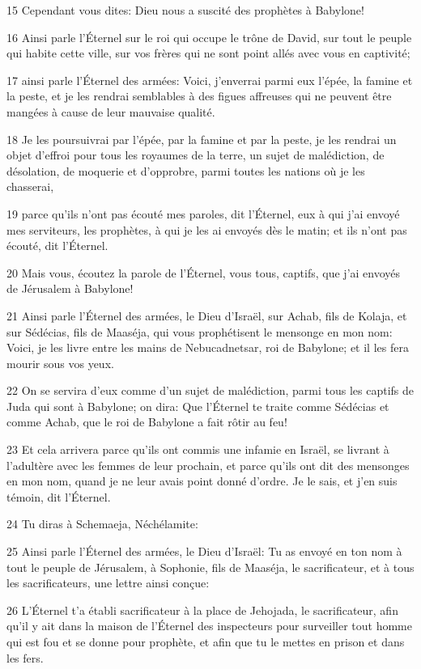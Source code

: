 \par 15 Cependant vous dites: Dieu nous a suscité des prophètes à Babylone!
\par 16 Ainsi parle l'Éternel sur le roi qui occupe le trône de David, sur tout le peuple qui habite cette ville, sur vos frères qui ne sont point allés avec vous en captivité;
\par 17 ainsi parle l'Éternel des armées: Voici, j'enverrai parmi eux l'épée, la famine et la peste, et je les rendrai semblables à des figues affreuses qui ne peuvent être mangées à cause de leur mauvaise qualité.
\par 18 Je les poursuivrai par l'épée, par la famine et par la peste, je les rendrai un objet d'effroi pour tous les royaumes de la terre, un sujet de malédiction, de désolation, de moquerie et d'opprobre, parmi toutes les nations où je les chasserai,
\par 19 parce qu'ils n'ont pas écouté mes paroles, dit l'Éternel, eux à qui j'ai envoyé mes serviteurs, les prophètes, à qui je les ai envoyés dès le matin; et ils n'ont pas écouté, dit l'Éternel.
\par 20 Mais vous, écoutez la parole de l'Éternel, vous tous, captifs, que j'ai envoyés de Jérusalem à Babylone!
\par 21 Ainsi parle l'Éternel des armées, le Dieu d'Israël, sur Achab, fils de Kolaja, et sur Sédécias, fils de Maaséja, qui vous prophétisent le mensonge en mon nom: Voici, je les livre entre les mains de Nebucadnetsar, roi de Babylone; et il les fera mourir sous vos yeux.
\par 22 On se servira d'eux comme d'un sujet de malédiction, parmi tous les captifs de Juda qui sont à Babylone; on dira: Que l'Éternel te traite comme Sédécias et comme Achab, que le roi de Babylone a fait rôtir au feu!
\par 23 Et cela arrivera parce qu'ils ont commis une infamie en Israël, se livrant à l'adultère avec les femmes de leur prochain, et parce qu'ils ont dit des mensonges en mon nom, quand je ne leur avais point donné d'ordre. Je le sais, et j'en suis témoin, dit l'Éternel.
\par 24 Tu diras à Schemaeja, Néchélamite:
\par 25 Ainsi parle l'Éternel des armées, le Dieu d'Israël: Tu as envoyé en ton nom à tout le peuple de Jérusalem, à Sophonie, fils de Maaséja, le sacrificateur, et à tous les sacrificateurs, une lettre ainsi conçue:
\par 26 L'Éternel t'a établi sacrificateur à la place de Jehojada, le sacrificateur, afin qu'il y ait dans la maison de l'Éternel des inspecteurs pour surveiller tout homme qui est fou et se donne pour prophète, et afin que tu le mettes en prison et dans les fers.
